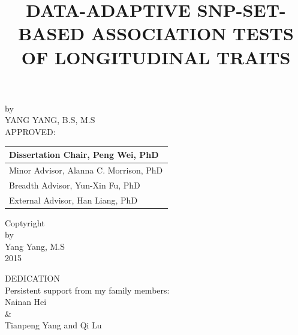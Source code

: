 \documentclass[12pt]{article}
\begin{document}
%
\begin{titlepage}
\title{\normalsize DATA-ADAPTIVE SNP-SET-BASED ASSOCIATION TESTS OF LONGITUDINAL TRAITS}
\date{}
\maketitle

{\normalsize
\begin{center}
by\\[5mm]
YANG YANG, B.S, M.S\\[10mm]
APPROVED:\\[10mm]
\end{center}}

\begin{table}[h]
\begin{flushright}
\begin{tabular}{ p{8cm}}

\hline
Dissertation Chair, Peng Wei, PhD\ \\[0.8cm]
\hline
Minor Advisor, Alanna C. Morrison, PhD\\[0.8cm]
\hline
Breadth Advisor, Yun-Xin Fu, PhD\\[0.8cm]
\hline
External Advisor, Han Liang, PhD\\[0.8cm]
\end{tabular}
\end{flushright}
\label{default}
\end{table}

\thispagestyle{empty}
\pagestyle{empty}
\end{titlepage}

\newpage
\thispagestyle{empty}
\begin{center}
Coptyright\\
by\\
Yang Yang, M.S\\
2015
\end{center}


\newpage
\thispagestyle{empty}
\doublespacing
\begin{center}
DEDICATION\\
Persistent support from my family members:\\
Nainan Hei\\
\&\\
Tianpeng Yang and Qi Lu
\end{center}
\end{document}
